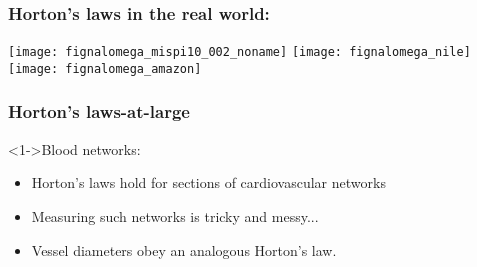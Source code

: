 \begin{frame}[label=]
  \frametitle{Horton's laws in the real world:}

  \begin{center}
    \texttt{[image: fignalomega\_mispi10\_002\_noname]} 
    \texttt{[image: fignalomega\_nile]} \\
    \texttt{[image: fignalomega\_amazon]} 
  \end{center}

\end{frame}


\begin{frame}[label=]
  \frametitle{Horton's laws-at-large}
  
  \begin{block}<1->{Blood networks:}
    \begin{itemize}
    \item<2->
      Horton's laws hold for sections
      of cardiovascular networks
    \item<3->
      Measuring such networks is tricky and messy...
    \item<4->
      Vessel diameters obey an analogous Horton's law.
    \end{itemize}
  \end{block}

\end{frame}

